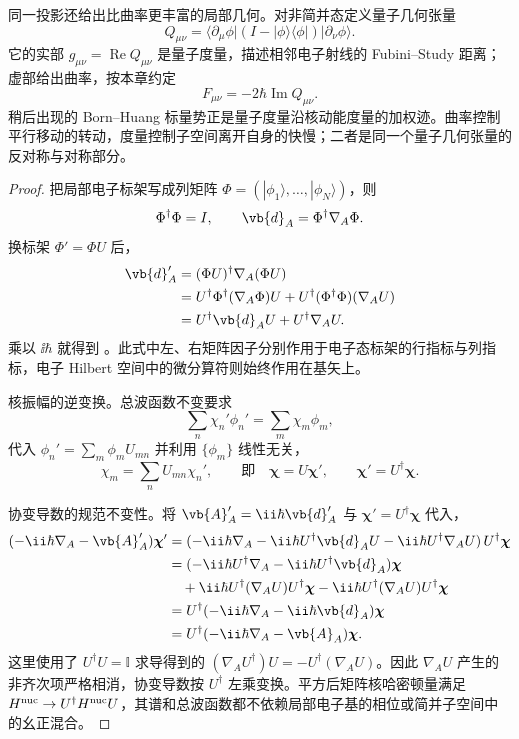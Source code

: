同一投影还给出比曲率更丰富的局部几何。对非简并态定义量子几何张量
\begin{equation}
Q_{\mu\nu}
=\langle\partial_\mu\phi|
(I-|\phi\rangle\langle\phi|)
|\partial_\nu\phi\rangle .
\label{eq:quantum-geometric-tensor}
\end{equation}
它的实部
\(g_{\mu\nu}=\operatorname{Re}Q_{\mu\nu}\)
是量子度量，描述相邻电子射线的 Fubini--Study 距离；虚部给出曲率，按本章约定
\begin{equation}
F_{\mu\nu}=-2\hbar\operatorname{Im}Q_{\mu\nu}.
\label{eq:qgt-curvature-relation}
\end{equation}
稍后出现的 Born--Huang 标量势正是量子度量沿核动能度量的加权迹。曲率控制平行移动的转动，度量控制子空间离开自身的快慢；二者是同一个量子几何张量的反对称与对称部分。

\begin{proof}
把局部电子标架写成列矩阵 \(\Phi=(|\phi_1\rangle,\ldots,|\phi_N\rangle)\)，则
\[
\Phi^\dagger\Phi=I,\qquad
\vb{d}_A=\Phi^\dagger\nabla_A\Phi .
\]
换标架 \(\Phi'=\Phi U\) 后，
\begin{align*}
\vb{d}_A'
&=(\Phi U)^\dagger\nabla_A(\Phi U)\\
&=U^\dagger\Phi^\dagger(\nabla_A\Phi)U
+U^\dagger(\Phi^\dagger\Phi)(\nabla_AU)\\
&=U^\dagger\vb{d}_AU+U^\dagger\nabla_AU .
\end{align*}
乘以 \(\ii\hbar\) 就得到 。此式中左、右矩阵因子分别作用于电子态标架的行指标与列指标，电子 Hilbert 空间中的微分算符则始终作用在基矢上。

核振幅的逆变换。总波函数不变要求
\[
 \sum_n\chi_n'\phi_n'=\sum_m\chi_m\phi_m,
\]
代入 \(\phi_n'=\sum_m\phi_mU_{mn}\) 并利用 \(\{\phi_m\}\) 线性无关，
\[
 \chi_m=\sum_nU_{mn}\chi_n',
 \qquad\text{即}\quad
 \boldsymbol\chi=U\boldsymbol\chi',
 \qquad \boldsymbol\chi'=U^\dagger\boldsymbol\chi.
\]

协变导数的规范不变性。将 \(\vb{A}_A'=\ii\hbar\vb{d}_A'\) 与 \(\boldsymbol\chi'=U^\dagger\boldsymbol\chi\) 代入，
\[
 \begin{aligned}
 (-\ii\hbar\nabla_A-\vb{A}_A')\boldsymbol\chi'
 &=(-\ii\hbar\nabla_A-\ii\hbar U^\dagger\vb{d}_AU-\ii\hbar U^\dagger\nabla_AU)\,U^\dagger\boldsymbol\chi\\
 &=(-\ii\hbar U^\dagger\nabla_A-\ii\hbar U^\dagger\vb{d}_A)\boldsymbol\chi\\
 &\quad +\ii\hbar U^\dagger(\nabla_AU)U^\dagger\boldsymbol\chi-\ii\hbar U^\dagger(\nabla_AU)U^\dagger\boldsymbol\chi\\
 &=U^\dagger(-\ii\hbar\nabla_A-\ii\hbar\vb{d}_A)\boldsymbol\chi\\
 &=U^\dagger(-\ii\hbar\nabla_A-\vb{A}_A)\boldsymbol\chi.
 \end{aligned}
\]
这里使用了 \(U^\dagger U=\mathbb I\) 求导得到的
\((\nabla_AU^\dagger)U=-U^\dagger(\nabla_AU)\)。因此
\(\nabla_AU\) 产生的非齐次项严格相消，协变导数按
\(U^\dagger\) 左乘变换。平方后矩阵核哈密顿量满足
\(H^{\rm nuc}\to U^\dagger H^{\rm nuc}U\)，其谱和总波函数都不依赖局部电子基的相位或简并子空间中的幺正混合。
\end{proof}

